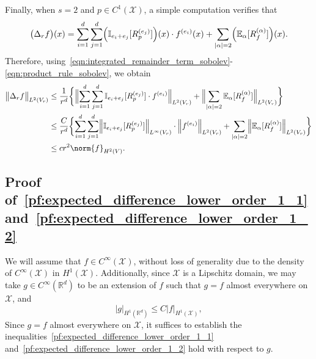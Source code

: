 \documentclass{article}
\newcommand{\Reals}{\mathbb{R}}
\newcommand{\abs}[1]{\left \lvert #1 \right \rvert}
\newcommand{\1}{\mathbf{1}}
\newcommand{\Rd}{\Reals^d}
\newcommand{\Xset}{\mathcal{X}}
\newcommand{\Leb}{L}
\newcommand{\Ebb}{\mathbb{E}}
\newcommand{\Ibb}{\mathbb{I}}
\theoremstyle{alden}
\theoremstyle{aldenthm}
\theoremstyle{definition}
\theoremstyle{remark}
\begin{document}
Finally, when $s = 2$ and $p \in C^1(\Xset)$, a simple computation verifies that
\begin{equation*}
\bigl(\Delta_rf\bigr)(x) = \sum_{i = 1}^{d} \sum_{j = 1}^{d} \Bigl(\Ibb_{e_i + e_j}[R_p^{(e_j)}]\Bigr)(x) \cdot f^{(e_i)}(x) + \sum_{\abs{\alpha} = 2}  \Bigl(\Ebb_{\alpha}[R_f^{(\alpha)}]\Bigr)(x).
\end{equation*}
Therefore, using~\eqref{eqn:integrated_remainder_term_sobolev}-\eqref{eqn:product_rule_sobolev}, we obtain
\begin{align*}
\bigl\|\Delta_rf\bigr\|_{\Leb^2(V_r)} & \leq \frac{1}{r^d} \biggl\{ \Bigl\|\sum_{i = 1}^{d} \sum_{j = 1}^{d} \Ibb_{e_i + e_j}[R_p^{(e_j)}] \cdot f^{(e_i)} \Bigr\|_{\Leb^2(V_r)} + \Bigl\|\sum_{\abs{\alpha} = 2} \Ebb_{\alpha}[R_f^{(\alpha)}]\Bigr\|_{\Leb^2(V_r)} \biggr\} \\
& \leq \frac{C}{r^d} \biggl\{ \sum_{i = 1}^{d} \sum_{j = 1}^{d} \Bigl\|\Ibb_{e_i + e_j}[R_p^{(e_j)}]\Bigr\|_{\Leb^{\infty}(V_r)} \cdot \Bigl\|f^{(e_i)} \Bigr\|_{\Leb^2(V_r)} + \sum_{\abs{\alpha} = 2} \Bigl\|\Ebb_{\alpha}[R_f^{(\alpha)}]\Bigr\|_{\Leb^2(V_r)} \biggr\} \\
& \leq c r^2 \norm{f}_{H^2(V)}.
\end{align*}

\subsection{Proof of~\eqref{pf:expected_difference_lower_order_1_1} and~\eqref{pf:expected_difference_lower_order_1_2}}
\label{subsec:proof_expected_difference_lower_order}

We will assume that $f \in C^{\infty}(\Xset)$, without loss of generality due to the density of $C^{\infty}(\Xset)$ in $H^1(\Xset)$. Additionally, since $\Xset$ is a Lipschitz domain, we may take $g \in C^{\infty}(\Rd)$ to be an extension of $f$ such that $g = f$ almost everywhere on $\Xset$, and
\begin{equation*}
|g|_{H^1(\Rd)} \leq C|f|_{H^1(\Xset)},
\end{equation*}
Since $g = f$ almost everywhere on $\Xset$, it suffices to establish the inequalities~\eqref{pf:expected_difference_lower_order_1_1} and~\eqref{pf:expected_difference_lower_order_1_2} hold with respect to $g$.
\end{document}
